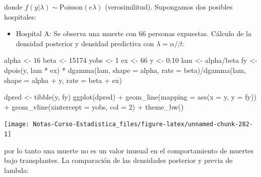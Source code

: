 \documentclass[
  12pt,
]{book}
\newenvironment{Shaded}{\begin{snugshade}}{\end{snugshade}}
\newcommand{\AttributeTok}[1]{\textcolor[rgb]{0.77,0.63,0.00}{#1}}
\newcommand{\DecValTok}[1]{\textcolor[rgb]{0.00,0.00,0.81}{#1}}
\newcommand{\FunctionTok}[1]{\textcolor[rgb]{0.00,0.00,0.00}{#1}}
\newcommand{\NormalTok}[1]{#1}
\newcommand{\OtherTok}[1]{\textcolor[rgb]{0.56,0.35,0.01}{#1}}
\newcommand{\SpecialCharTok}[1]{\textcolor[rgb]{0.00,0.00,0.00}{#1}}
\providecommand{\tightlist}{%
  \setlength{\itemsep}{0pt}\setlength{\parskip}{0pt}}
\begin{document}
donde \(f(y|\lambda)\sim \text{Poisson}(e\lambda)\) (verosimilitud).
Supongamos dos posibles hospitales:

\begin{itemize}
\tightlist
\item
  Hospital A: Se observa una muerte con 66 personas expuestas. Cálculo
  de la densidad posterior y densidad predictiva con
  \(\lambda = \alpha/\beta\):
\end{itemize}

\begin{Shaded}
\begin{Highlighting}[]
\NormalTok{alpha }\OtherTok{\textless{}{-}} \DecValTok{16}
\NormalTok{beta }\OtherTok{\textless{}{-}} \DecValTok{15174}
\NormalTok{yobs }\OtherTok{\textless{}{-}} \DecValTok{1}
\NormalTok{ex }\OtherTok{\textless{}{-}} \DecValTok{66}
\NormalTok{y }\OtherTok{\textless{}{-}} \DecValTok{0}\SpecialCharTok{:}\DecValTok{10}
\NormalTok{lam }\OtherTok{\textless{}{-}}\NormalTok{ alpha}\SpecialCharTok{/}\NormalTok{beta}
\NormalTok{fy }\OtherTok{\textless{}{-}} \FunctionTok{dpois}\NormalTok{(y, lam }\SpecialCharTok{*}\NormalTok{ ex) }\SpecialCharTok{*} \FunctionTok{dgamma}\NormalTok{(lam, }\AttributeTok{shape =}\NormalTok{ alpha,}
    \AttributeTok{rate =}\NormalTok{ beta)}\SpecialCharTok{/}\FunctionTok{dgamma}\NormalTok{(lam, }\AttributeTok{shape =}\NormalTok{ alpha }\SpecialCharTok{+}\NormalTok{ y, }\AttributeTok{rate =}\NormalTok{ beta }\SpecialCharTok{+}
\NormalTok{    ex)}

\NormalTok{dpred }\OtherTok{\textless{}{-}} \FunctionTok{tibble}\NormalTok{(y, fy)}
\FunctionTok{ggplot}\NormalTok{(dpred) }\SpecialCharTok{+} \FunctionTok{geom\_line}\NormalTok{(}\AttributeTok{mapping =} \FunctionTok{aes}\NormalTok{(}\AttributeTok{x =}\NormalTok{ y, }\AttributeTok{y =}\NormalTok{ fy)) }\SpecialCharTok{+}
    \FunctionTok{geom\_vline}\NormalTok{(}\AttributeTok{xintercept =}\NormalTok{ yobs, }\AttributeTok{col =} \DecValTok{2}\NormalTok{) }\SpecialCharTok{+} \FunctionTok{theme\_bw}\NormalTok{()}
\end{Highlighting}
\end{Shaded}

\begin{center}\texttt{[image: Notas-Curso-Estadistica\_files/figure-latex/unnamed-chunk-282-1]} \end{center}

por lo tanto una muerte no es un valor inusual en el comportamiento de
muertes bajo transplantes. La comparación de las densidades posterior y
previa de lambda:
\end{document}
